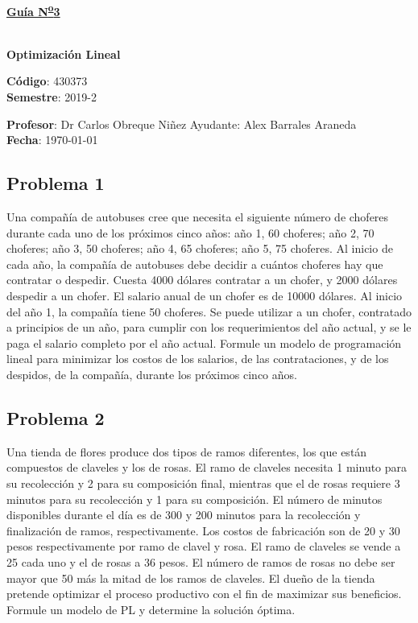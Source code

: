 \documentclass[letterpaper]{article}
\begin{document}
\vspace*{0.5\baselineskip}
\begin{center}
\begin{Large}
\textbf{\underline{Guía N\textsuperscript{\underline{o}}3}}
\end{Large}\\
\vspace*{0.5\baselineskip}
\textbf{Optimización Lineal} \\
\vspace*{0.5\baselineskip}
\begin{footnotesize}
\textbf{Código}: 430373\\
\textbf{Semestre}: 2019-2
\end{footnotesize}
\end{center}

\noindent \textbf{Profesor}: Dr Carlos Obreque Niñez  \hfill Ayudante: Alex Barrales Araneda\\
\noindent \textbf{Fecha}: \today

\subsection*{Problema 1}
Una compañía de autobuses cree que necesita el siguiente número de choferes durante cada uno de los próximos cinco años: año 1, 60 choferes; año 2, 70 choferes; año 3, 50 choferes; año 4, 65 choferes; año 5, 75 choferes. Al inicio de cada año, la compañía de autobuses debe decidir a cuántos choferes hay que contratar o despedir. Cuesta 4000 dólares contratar a un chofer, y 2000 dólares despedir a un chofer. El salario anual de un chofer es de 10000 dólares. Al inicio del año 1, la compañía tiene 50 choferes. Se puede utilizar a un chofer, contratado a principios de un año, para cumplir con los requerimientos del año actual, y se le paga el salario completo por el año actual. Formule un modelo de programación lineal para minimizar los costos de los salarios, de las contrataciones, y de los despidos, de la compañía, durante los próximos cinco años.

\subsection*{Problema 2}
Una tienda de flores produce dos tipos de ramos diferentes, los que están compuestos de claveles y los de rosas. El ramo de claveles necesita 1 minuto para su recolección y 2 para su composición final, mientras que el de rosas requiere 3 minutos para su recolección y 1 para su composición. El número de minutos disponibles durante el día es de 300 y 200 minutos para la recolección y finalización de ramos, respectivamente. Los costos de fabricación son de 20 y 30 pesos respectivamente por ramo de clavel y rosa. El ramo de claveles se vende a 25 cada uno y el de rosas a 36 pesos. El número de ramos de rosas no debe ser mayor que 50 más la mitad de los ramos de claveles. El dueño de la tienda pretende optimizar el proceso productivo con el fin de maximizar sus beneficios. Formule un modelo de PL y determine la solución óptima.
\end{document}
